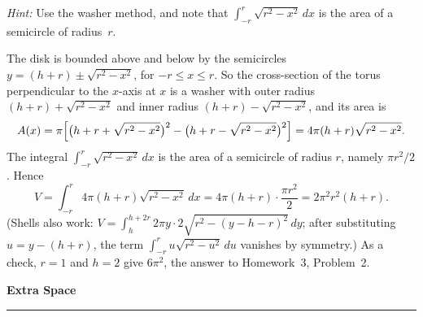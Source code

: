 \documentclass[12pt,letterpaper]{article}
\newcommand{\workspace}{\vfill\newpage}
\begin{document}
\begin{enumerate}[label=\textbf{\arabic*.},leftmargin=2em]
\begin{center}
    \end{center}

    \emph{Hint:} Use the washer method, and note that
    $\int_{-r}^{r}\sqrt{r^2-x^2}\,dx$ is the area of a semicircle of
    radius~$r$.

    \begin{solution}
      The disk is bounded above and below by the semicircles
      $y=(h+r)\pm\sqrt{r^2-x^2}$, for $-r\le x\le r$. So the cross-section
      of the torus perpendicular to the $x$-axis at $x$ is a washer with
      outer radius $(h+r)+\sqrt{r^2-x^2}$ and inner radius
      $(h+r)-\sqrt{r^2-x^2}$, and its area is
      \[
        A(x)=\pi\Bigl[\bigl(h+r+\sqrt{r^2-x^2}\bigr)^2
          -\bigl(h+r-\sqrt{r^2-x^2}\bigr)^2\Bigr]
        =4\pi(h+r)\sqrt{r^2-x^2}.
      \]
      The integral $\int_{-r}^{r}\sqrt{r^2-x^2}\,dx$ is the area of a
      semicircle of radius $r$, namely $\pi r^2/2$. Hence
      \[
        V=\int_{-r}^{r}4\pi(h+r)\sqrt{r^2-x^2}\,dx
         =4\pi(h+r)\cdot\frac{\pi r^2}{2}=2\pi^2r^2(h+r).
      \]
      (Shells also work:
      $V=\int_h^{h+2r}2\pi y\cdot 2\sqrt{r^2-(y-h-r)^2}\,dy$; after
      substituting $u=y-(h+r)$, the term $\int_{-r}^{r}u\sqrt{r^2-u^2}\,du$
      vanishes by symmetry.) As a check, $r=1$ and $h=2$ give $6\pi^2$, the
      answer to Homework~3, Problem~2.
    \end{solution}
    \workspace
\end{enumerate}

\begin{center}
  {\Large\bfseries Extra Space}\\[0.3em]
  \noindent\rule{\linewidth}{0.4pt}
\end{center}

\end{document}
